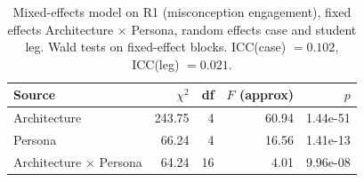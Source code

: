 \begin{table}[htbp]
\centering
\caption{Mixed-effects model on R1 (misconception engagement), fixed effects Architecture $\times$ Persona, random effects case and student leg. Wald tests on fixed-effect blocks. ICC(case) $= 0.102$, ICC(leg) $= 0.021$.}
\label{tab:anova-R1}
\begin{tabular}{lrrrr}
\toprule
Source & $\chi^2$ & df & $F$ (approx) & $p$ \\
\midrule
Architecture & 243.75 & 4 & 60.94 & 1.44e-51 \\
Persona & 66.24 & 4 & 16.56 & 1.41e-13 \\
Architecture $\times$ Persona & 64.24 & 16 & 4.01 & 9.96e-08 \\
\bottomrule
\end{tabular}
\end{table}
